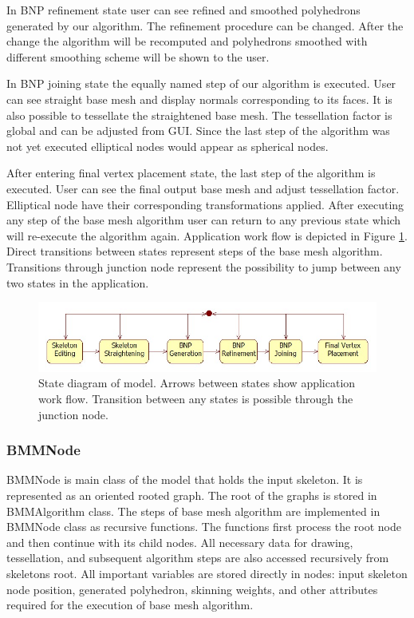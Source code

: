 In BNP refinement state user can see refined and smoothed polyhedrons generated by our algorithm.
The refinement procedure can be changed.
After the change the algorithm will be recomputed and polyhedrons smoothed with different smoothing scheme will be shown to the user.

In BNP joining state the equally named step of our algorithm is executed.
User can see straight base mesh and display normals corresponding to its faces.
It is also possible to tessellate the straightened base mesh.
The tessellation factor is global and can be adjusted from GUI.
Since the last step of the algorithm was not yet executed elliptical nodes would appear as spherical nodes.

After entering final vertex placement state, the last step of the algorithm is executed.
User can see the final output base mesh and adjust tessellation factor.
Elliptical node have their corresponding transformations applied.
After executing any step of the base mesh algorithm user can return to any previous state which will re-execute the algorithm again.
Application work flow is depicted in Figure \ref{fig:states}.
Direct transitions between states represent steps of the base mesh algorithm.
Transitions through junction node represent the possibility to jump between any two states in the application.

\begin{figure}[h]
    \centering
    \includegraphics[width=\textwidth]{images/states}
    \caption[Model state diagram]{State diagram of model. Arrows between states show application work flow. Transition between any states is possible through the junction node.}
    \label{fig:states}
\end{figure}

\subsubsection{BMMNode}

BMMNode is main class of the model that holds the input skeleton.
It is represented as an oriented rooted graph.
The root of the graphs is stored in BMMAlgorithm class.
The steps of base mesh algorithm are implemented in BMMNode class as recursive functions.
The functions first process the root node and then continue with its child nodes.
All necessary data for drawing, tessellation, and subsequent algorithm steps are also accessed recursively from skeletons root. All important variables are stored directly in nodes: input skeleton node position, generated polyhedron, skinning weights, and other attributes required for the execution of base mesh algorithm.

